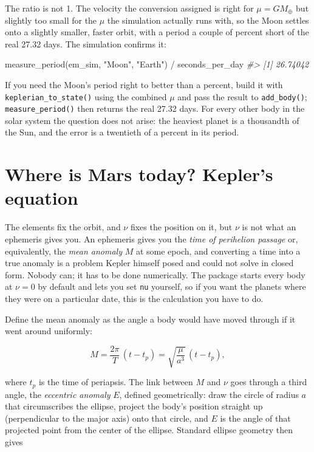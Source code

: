\documentclass[
  10.5pt,
  letterpaper,
]{scrbook}
\newenvironment{Shaded}{\begin{snugshade}}{\end{snugshade}}
\newcommand{\CommentTok}[1]{\textcolor[rgb]{0.00,0.00,0.00}{\textit{#1}}}
\newcommand{\FunctionTok}[1]{\textcolor[rgb]{0.00,0.00,0.00}{#1}}
\newcommand{\NormalTok}[1]{\textcolor[rgb]{0.00,0.00,0.00}{#1}}
\newcommand{\SpecialCharTok}[1]{\textcolor[rgb]{0.00,0.00,0.00}{#1}}
\newcommand{\StringTok}[1]{\textcolor[rgb]{0.00,0.00,0.00}{#1}}
\theoremstyle{plain}
\theoremstyle{remark}
\begin{document}
The ratio is not 1. The velocity the conversion assigned is right for
\(\mu = GM_\oplus\) but slightly too small for the \(\mu\) the
simulation actually runs with, so the Moon settles onto a slightly
smaller, faster orbit, with a period a couple of percent short of the
real 27.32 days. The simulation confirms it:

\begin{Shaded}
\begin{Highlighting}[]
\FunctionTok{measure\_period}\NormalTok{(em\_sim, }\StringTok{"Moon"}\NormalTok{, }\StringTok{"Earth"}\NormalTok{) }\SpecialCharTok{/}\NormalTok{ seconds\_per\_day}
\CommentTok{\#\textgreater{} [1] 26.74042}
\end{Highlighting}
\end{Shaded}

If you need the Moon's period right to better than a percent, build it
with \texttt{keplerian\_to\_state()} using the combined \(\mu\) and pass
the result to \texttt{add\_body()}; \texttt{measure\_period()} then
returns the real 27.32 days. For every other body in the solar system
the question does not arise: the heaviest planet is a thousandth of the
Sun, and the error is a twentieth of a percent in its period.

\section{Where is Mars today? Kepler's
equation}\label{where-is-mars-today-keplers-equation}

The elements fix the orbit, and \(\nu\) fixes the position on it, but
\(\nu\) is not what an ephemeris gives you. An ephemeris gives you the
\emph{time of perihelion passage} or, equivalently, the \emph{mean
anomaly} \(M\) at some epoch, and converting a time into a true anomaly
is a problem Kepler himself posed and could not solve in closed form.
Nobody can; it has to be done numerically. The package starts every body
at \(\nu = 0\) by default and lets you set \texttt{nu} yourself, so if
you want the planets where they were on a particular date, this is the
calculation you have to do.

Define the mean anomaly as the angle a body would have moved through if
it went around uniformly:

\[
M = \frac{2\pi}{T}\,(t - t_p) = \sqrt{\frac{\mu}{a^3}}\,(t - t_p),
\]

where \(t_p\) is the time of periapsis. The link between \(M\) and
\(\nu\) goes through a third angle, the \emph{eccentric anomaly} \(E\),
defined geometrically: draw the circle of radius \(a\) that
circumscribes the ellipse, project the body's position straight up
(perpendicular to the major axis) onto that circle, and \(E\) is the
angle of that projected point from the center of the ellipse. Standard
ellipse geometry then gives
\end{document}

